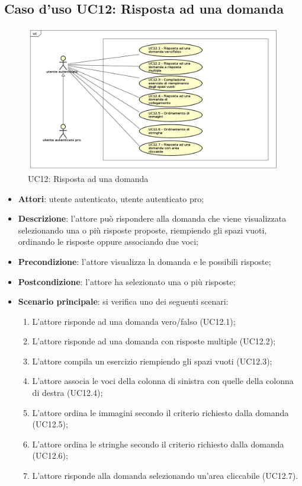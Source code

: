 \newpage
\subsection{Caso d'uso UC12: Risposta ad una domanda}
\label{UC12}
\begin{figure}[h]
	\centering
	\includegraphics[scale=0.5]{UML/UC12.png}
	\caption{UC12: Risposta ad una domanda}
\end{figure}

\begin{itemize}
\item \textbf{Attori}: utente autenticato, utente autenticato pro;
\item \textbf{Descrizione}: l'attore può rispondere alla domanda che viene visualizzata selezionando una o più risposte proposte, riempiendo gli spazi vuoti, ordinando le risposte oppure associando due voci;
\item \textbf{Precondizione}: l'attore visualizza la domanda e le possibili risposte;
\item \textbf{Postcondizione}: l'attore ha selezionato una o più risposte;
\item \textbf{Scenario principale}: si verifica uno dei seguenti scenari:
\begin{enumerate}
	\item L'attore risponde ad una domanda vero/falso (UC12.1);
	\item L'attore risponde ad una domanda con risposte multiple (UC12.2);
	\item L'attore compila un esercizio riempiendo gli spazi vuoti (UC12.3);
	\item L'attore associa le voci della colonna di sinistra con quelle della colonna di destra (UC12.4);
	\item L'attore ordina le immagini secondo il criterio richiesto dalla domanda (UC12.5);
	\item L'attore ordina le stringhe secondo il criterio richiesto dalla domanda (UC12.6);
	\item L'attore risponde alla domanda selezionando un'area cliccabile (UC12.7). 
\end{enumerate}
\end{itemize}


